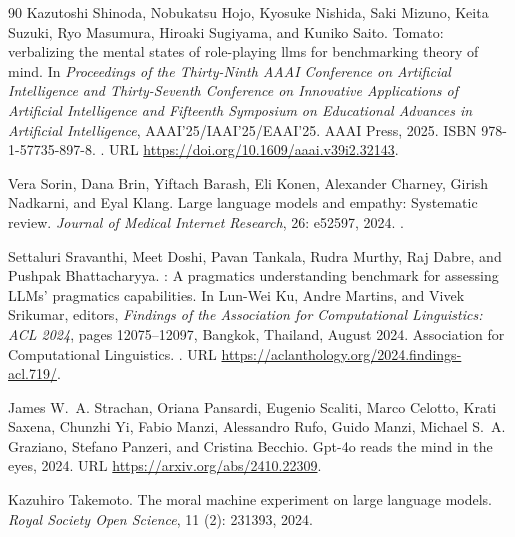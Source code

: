 \begin{thebibliography}{90}
Kazutoshi Shinoda, Nobukatsu Hojo, Kyosuke Nishida, Saki Mizuno, Keita Suzuki, Ryo Masumura, Hiroaki Sugiyama, and Kuniko Saito.
\newblock Tomato: verbalizing the mental states of role-playing llms for benchmarking theory of mind.
\newblock In \emph{Proceedings of the Thirty-Ninth AAAI Conference on Artificial Intelligence and Thirty-Seventh Conference on Innovative Applications of Artificial Intelligence and Fifteenth Symposium on Educational Advances in Artificial Intelligence}, AAAI'25/IAAI'25/EAAI'25. AAAI Press, 2025.
\newblock ISBN 978-1-57735-897-8.
\newblock {}.
\newblock URL \url{https://doi.org/10.1609/aaai.v39i2.32143}.

Vera Sorin, Dana Brin, Yiftach Barash, Eli Konen, Alexander Charney, Girish Nadkarni, and Eyal Klang.
\newblock Large language models and empathy: Systematic review.
\newblock \emph{Journal of Medical Internet Research}, 26: e52597, 2024.
\newblock {}.

Settaluri Sravanthi, Meet Doshi, Pavan Tankala, Rudra Murthy, Raj Dabre, and Pushpak Bhattacharyya.
: A pragmatics understanding benchmark for assessing {LLM}s' pragmatics capabilities.
\newblock In Lun-Wei Ku, Andre Martins, and Vivek Srikumar, editors, \emph{Findings of the Association for Computational Linguistics: ACL 2024}, pages 12075--12097, Bangkok, Thailand, August 2024. Association for Computational Linguistics.
\newblock {}.
\newblock URL \url{https://aclanthology.org/2024.findings-acl.719/}.

James W.~A. Strachan, Oriana Pansardi, Eugenio Scaliti, Marco Celotto, Krati Saxena, Chunzhi Yi, Fabio Manzi, Alessandro Rufo, Guido Manzi, Michael S.~A. Graziano, Stefano Panzeri, and Cristina Becchio.
\newblock Gpt-4o reads the mind in the eyes, 2024.
\newblock URL \url{https://arxiv.org/abs/2410.22309}.

Kazuhiro Takemoto.
\newblock The moral machine experiment on large language models.
\newblock \emph{Royal Society Open Science}, 11 (2): 231393, 2024.


\end{thebibliography}
